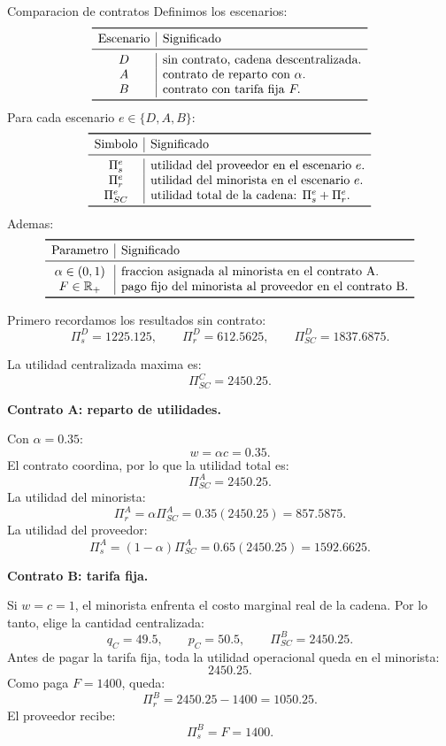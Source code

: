 \begin{solucion}{Comparacion de contratos}
Definimos los escenarios:
\[
\begin{array}{c|l}
\toprule
\text{Escenario} & \text{Significado} \\
\midrule
D & \text{sin contrato, cadena descentralizada.}\\
A & \text{contrato de reparto con } \alpha.\\
B & \text{contrato con tarifa fija } F.\\
\bottomrule
\end{array}
\]
Para cada escenario \(e\in\{D,A,B\}\):
\[
\begin{array}{c|l}
\toprule
\text{Simbolo} & \text{Significado} \\
\midrule
\Pi_s^e & \text{utilidad del proveedor en el escenario } e.\\
\Pi_r^e & \text{utilidad del minorista en el escenario } e.\\
\Pi_{SC}^e & \text{utilidad total de la cadena: } \Pi_s^e+\Pi_r^e.\\
\bottomrule
\end{array}
\]
Ademas:
\[
\begin{array}{c|l}
\toprule
\text{Parametro} & \text{Significado} \\
\midrule
\alpha\in(0,1) & \text{fraccion asignada al minorista en el contrato A.}\\
F\in\mathbb{R}_+ & \text{pago fijo del minorista al proveedor en el contrato B.}\\
\bottomrule
\end{array}
\]

Primero recordamos los resultados sin contrato:
\[
\Pi_s^D=1225.125,
\qquad
\Pi_r^D=612.5625,
\qquad
\Pi_{SC}^D=1837.6875.
\]

La utilidad centralizada maxima es:
\[
\Pi_{SC}^C=2450.25.
\]

\textbf{Contrato A: reparto de utilidades.}

Con \(\alpha=0.35\):
\[
w=\alpha c=0.35.
\]
El contrato coordina, por lo que la utilidad total es:
\[
\Pi_{SC}^{A}=2450.25.
\]
La utilidad del minorista:
\[
\Pi_r^{A}=\alpha\Pi_{SC}^{A}
=0.35(2450.25)
=857.5875.
\]
La utilidad del proveedor:
\[
\Pi_s^{A}=(1-\alpha)\Pi_{SC}^{A}
=0.65(2450.25)
=1592.6625.
\]

\textbf{Contrato B: tarifa fija.}

Si \(w=c=1\), el minorista enfrenta el costo marginal real de la cadena. Por lo tanto, elige la cantidad centralizada:
\[
q_C=49.5,
\qquad
p_C=50.5,
\qquad
\Pi_{SC}^{B}=2450.25.
\]
Antes de pagar la tarifa fija, toda la utilidad operacional queda en el minorista:
\[
2450.25.
\]
Como paga \(F=1400\), queda:
\[
\Pi_r^B=2450.25-1400=1050.25.
\]
El proveedor recibe:
\[
\Pi_s^B=F=1400.
\]


\end{solucion}
